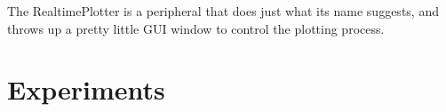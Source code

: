 \documentclass[letterpaper,12pt]{article}
\begin{document}
The RealtimePlotter is a peripheral that does just what its name suggests, and throws up a pretty little
GUI window to control the plotting process.



\section{Experiments}
















\end{document}
